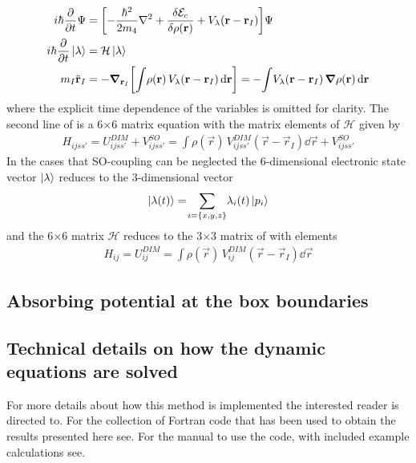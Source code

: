 			\begin{align}
				i\hbar\pdv{t}\Psi &= \qty[-\frac{\hbar^2}{2m_4}\laplacian +\fdv{\mathcal{E}_c}{\rho(\mathbf{r})} + V_\lambda(\vec{r}-\vec{r}_I)]\Psi \nonumber \\
				i\hbar\pdv{t}\ket\lambda  &= \mathcal{H}\ket\lambda \nonumber \\
				m_I\ddot{\vec{r}}_I &= - \grad_{\vec{r}_I}\qty[\int\!\rho(\vec{r})\,V_\lambda(\vec{r}-\vec{r}_I)\dd{\vec{r}}] = -\!\int\!V_\lambda(\vec{r}-\vec{r}_I)\,\grad\rho(\vec{r})\dd{\vec{r}} \label{eq:dyn-el}
			\end{align}
			where the explicit time dependence of the variables is omitted for clarity. The second line of  is a 6$\times$6 matrix equation with the matrix elements of $\mathcal{H}$ given by
			\begin{align}
				H_{ijss'} = U^{DIM}_{ijss'}+V^{SO}_{ijss'} = \int\!\rho(\vec{r})\,V^{DIM}_{ijss'}(\vec{r}-\vec{r}_I)\dd{\vec{r}}+V^{SO}_{ijss'}
			\end{align}
			In the cases that SO-coupling can be neglected the 6-dimensional electronic state vector $\ket{\lambda}$ reduces to the 3-dimensional vector
			\begin{align}
				\ket{\lambda(t)} = \!\sum_{i=\{x,y,z\}} \!\lambda_{i}(t) \ket{p_i}
			\end{align}
			and the 6$\times$6 matrix $\mathcal{H}$ reduces to the 3$\times$3 matrix of  with elements
			\begin{align}
				H_{ij} = U^{DIM}_{ij} = \int\!\rho(\vec{r})\,V^{DIM}_{ij}(\vec{r}-\vec{r}_I)\dd{\vec{r}}
			\end{align}
	
	\subsection{Absorbing potential at the box boundaries}
			
	\subsection{Technical details on how the dynamic equations are solved}
			
			For more details about how this method is implemented the interested reader is directed to. For the collection of Fortran code that has been used to obtain the results presented here see. For the manual to use the code, with included example calculations see.

\clearpage{\pagestyle{empty}\cleardoublepage}